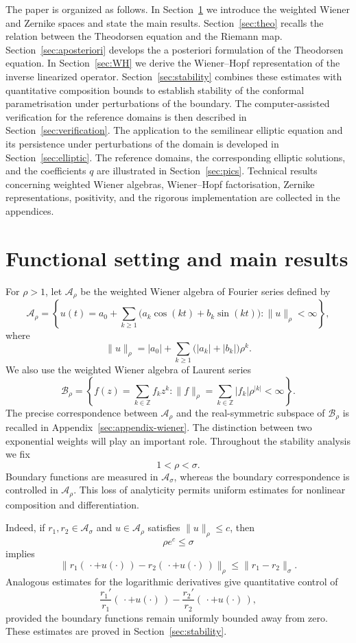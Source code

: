 \documentclass[11pt,a4paper]{amsart}
\begin{document}
The paper is organized as follows. In Section~\ref{sec:main-results} we introduce the
weighted Wiener and Zernike spaces and state the main results.
Section~\ref{sec:theo} recalls the relation between the Theodorsen equation and the
Riemann map. Section~\ref{sec:aposteriori} develops the a posteriori formulation of the
Theodorsen equation. In Section~\ref{sec:WH} we derive the Wiener--Hopf
representation of the inverse linearized operator. Section~\ref{sec:stability} combines
these estimates with quantitative composition bounds to establish
stability of the conformal parametrisation under perturbations of the
boundary. The computer-assisted verification for the reference
domains is then described in Section~\ref{sec:verification}. The application to the
semilinear elliptic equation and its persistence under perturbations
of the domain is developed in Section~\ref{sec:elliptic}. The reference domains, the corresponding elliptic solutions, and the coefficients \(q\) are illustrated in Section~\ref{sec:pics}. Technical results concerning
weighted Wiener algebras, Wiener--Hopf factorisation, Zernike
representations, positivity, and the rigorous implementation are
collected in the appendices.


\section{Functional setting and main results}
\label{sec:main-results}

For $\rho>1$, let $\mathcal A_\rho$ be the weighted Wiener algebra of Fourier series defined by
\[
\mathcal A_\rho
=
\left\{
u(t)
=
a_0+\sum_{k\geq1}
\bigl(a_k\cos(kt)+b_k\sin(kt)\bigr):
\|u\|_\rho<\infty
\right\},
\]
where
\[
\|u\|_\rho
=
|a_0|
+
\sum_{k\geq1}
\bigl(|a_k|+|b_k|\bigr)\rho^k.
\]
We also use the weighted Wiener algebra of Laurent series
\[
\mathcal B_\rho
=
\left\{
f(z)=\sum_{k\in\mathbb Z}f_kz^k:
\|f\|_\rho
=
\sum_{k\in\mathbb Z}|f_k|\rho^{|k|}
<\infty
\right\}.
\]
The precise correspondence between $\mathcal A_\rho$ and the
real-symmetric subspace of $\mathcal B_\rho$ is recalled in
Appendix~\ref{sec:appendix-wiener}.
The distinction between two exponential weights will play an
important role. Throughout the stability analysis we fix
\[
1<\rho<\sigma.
\]
Boundary functions are measured in $\mathcal A_\sigma$, whereas the
boundary correspondence is controlled in $\mathcal A_\rho$. This loss
of analyticity permits uniform estimates for nonlinear composition and
differentiation.

Indeed, if $r_1,r_2\in\mathcal A_\sigma$ and
$u\in\mathcal A_\rho$ satisfies $\|u\|_\rho\leq c$, then
\[
\rho e^c\leq\sigma
\]
implies
\begin{equation}\label{eq:composition-main}
	\bigl\|
	r_1(\,\cdot+u(\cdot)\,)
	-
	r_2(\,\cdot+u(\cdot)\,)
	\bigr\|_\rho
	\leq
	\|r_1-r_2\|_\sigma.
\end{equation}
Analogous estimates for the logarithmic derivatives give quantitative
control of
\[
\frac{r_1'}{r_1}(\,\cdot+u(\cdot)\,)
-
\frac{r_2'}{r_2}(\,\cdot+u(\cdot)\,),
\]
provided the boundary functions remain uniformly bounded away from
zero. These estimates are proved in Section~\ref{sec:stability}.
\end{document}
